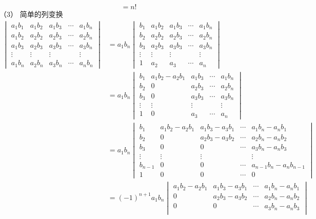 \begin{solution}
\[=n!
\]
\textup{（3）}
简单的列变换
\begin{align*}
	\begin{vmatrix}
	a_1b_1 & a_1b_2 & a_1b_3 & \cdots & a_1b_n\\
	a_1b_2 & a_2b_2 & a_2b_3 & \cdots & a_2b_n\\
	a_1b_3 & a_2b_3 & a_3b_3 & \cdots & a_3b_n\\
	\vdots & \vdots & \vdots &		  & \vdots\\
	a_1b_n & a_2b_n & a_3b_n & \cdots & a_nb_n 
\end{vmatrix}
&=a_1b_n
\begin{vmatrix}
	b_1 & a_1b_2 & a_1b_3 & \cdots & a_1b_n\\
	b_2 & a_2b_2 & a_2b_3 & \cdots & a_2b_n\\
	b_3 & a_2b_3 & a_3b_3 & \cdots & a_3b_n\\
	\vdots & \vdots & \vdots &		  & \vdots\\
	1 & a_2 & a_3 & \cdots & a_n 
\end{vmatrix}\\
&=a_1b_n
\begin{vmatrix}
	b_1 & a_1b_2 - a_2b_1 & a_1b_3 & \cdots & a_1b_n\\
	b_2 & 0 & a_2b_3 & \cdots & a_2b_n\\
	b_3 & 0 & a_3b_3 & \cdots & a_3b_n\\
	\vdots & \vdots & \vdots &		  & \vdots\\
	1 & 0 & a_3 & \cdots & a_n 
\end{vmatrix}\\
&=a_1b_n
\begin{vmatrix}
	b_1 & a_1b_2 - a_2b_1 & a_1b_3-a_3b_1 & \cdots & a_1b_n-a_nb_1\\
	b_2 & 0 & a_2b_3-a_3b_2 & \cdots & a_2b_n-a_nb_2\\
	b_3 & 0 & 0 & \cdots & a_3b_n-a_nb_3\\
	\vdots & \vdots & \vdots &		  & \vdots\\
	b_{n-1}&0&0&\cdots&a_{n-1}b_n-a_nb_{n-1}\\
	1 & 0 & 0 & \cdots & 0 
\end{vmatrix}
\\
&=\left(-1\right)^{n+1}a_1b_n
\begin{vmatrix}
	a_1b_2 - a_2b_1 & a_1b_3-a_3b_1 & \cdots & a_1b_n-a_nb_1\\
	 0 & a_2b_3-a_3b_2 & \cdots & a_2b_n-a_nb_2\\
	 0 & 0 & \cdots & a_3b_n-a_nb_3\\

\end{vmatrix}
\end{align*}
\end{solution}
